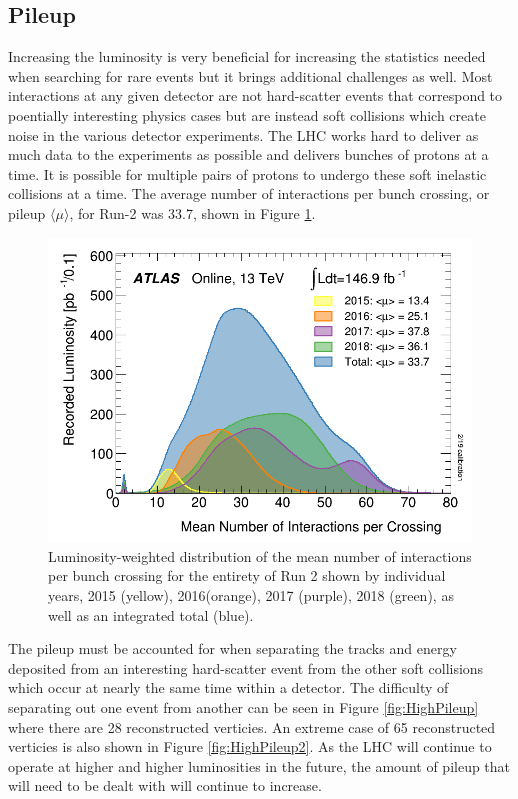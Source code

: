 \subsection{Pileup}

Increasing the luminosity is very beneficial for increasing the statistics needed when searching for rare events but it brings additional challenges as well.  Most interactions at any given detector are not hard-scatter events that correspond to poentially interesting physics cases but are instead soft collisions which create noise in the various detector experiments.  The LHC works hard to deliver as much data to the experiments as possible and delivers bunches of protons at a time.  It is possible for multiple pairs of protons to undergo these soft inelastic collisions at a time.  The average number of interactions per bunch crossing, or pileup $\langle{\mu}\rangle$, for Run-2 was 33.7, shown in Figure \ref{fig:ATLASmeanIntperCrossing}. 
\begin{figure}[ht!]
	\centering
	\includegraphics[width=.7\columnwidth]{../ThesisImages/LHCImages/meanIntperCrossing.png}
	\caption[Luminosity-weighted distribution of the mean number of interactions per bunch crossing for the entirety of Run 2 shown by individual years, 2015 (yellow), 2016(orange), 2017 (purple), 2018 (green), as well as an integrated total (blue).]{Luminosity-weighted distribution of the mean number of interactions per bunch crossing for the entirety of Run 2 shown by individual years, 2015 (yellow), 2016(orange), 2017 (purple), 2018 (green), as well as an integrated total (blue)\cite{ATLASLumi}.
	}
	\label{fig:ATLASmeanIntperCrossing}
\end{figure}
 The pileup must be accounted for when separating the tracks and energy deposited from an interesting hard-scatter event from the other soft collisions which occur at nearly the same time within a detector.  The difficulty of separating out one event from another can be seen in Figure \ref{fig:HighPileup} where there are 28 reconstructed verticies.  An extreme case of 65 reconstructed verticies is also shown in Figure \ref{fig:HighPileup2}.  As the LHC will continue to operate at higher and higher luminosities in the future, the amount of pileup that will need to be dealt with will continue to increase.  
